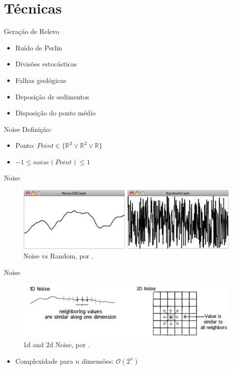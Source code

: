 \section{Técnicas}

\begin{frame}{Geração de Relevo}
    \begin{itemize}[<+- | alert@+>]
        \item \alert<6>{Ruído de Perlin}
        \item Divisões estocásticas
        \item Falhas geológicas
        \item Deposição de sedimentos
        \item Disposição do ponto médio
    \end{itemize}
\end{frame}

\begin{frame}{Noise}
    Definição:
    \begin{itemize}
        \item Ponto: $Point \in \{ \mathbb{R}^3 \vee \mathbb{R}^2 \vee \mathbb{R}\} $
        \item $ -1 \leq noise(Point) \leq 1$
    \end{itemize}
\end{frame}

\begin{frame}{Noise}
    \begin{figure}
		\centering
        \includegraphics[width=.7\textwidth]{img/explain/noiseRandom.png}
        \caption{\alert{Noise vs Random}, por \cite{shiffman2012nature}.}
    \end{figure}
\end{frame}

\begin{frame}{Noise}
    \begin{figure}
		\centering
        \includegraphics[width=.7\textwidth]{img/explain/1d2dnoise.png}
        \caption{\alert{1d and 2d Noise}, por \cite{shiffman2012nature}.}
    \end{figure}
    \begin{itemize}
        \item Complexidade para $n$ dimensões: $\mathcal{O}(2^n)$
    \end{itemize}
\end{frame}


